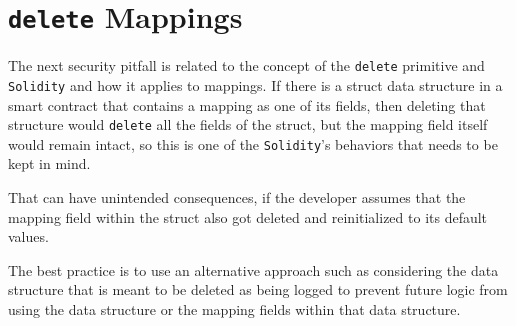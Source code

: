 \section{\texorpdfstring{\texttt{delete}
Mappings}{delete Mappings}}\label{delete-mappings}

The next security pitfall is related to the concept of the
\texttt{delete} primitive and \texttt{Solidity} and how it applies to
mappings. If there is a struct data structure in a smart contract that
contains a mapping as one of its fields, then deleting that structure
would \texttt{delete} all the fields of the struct, but the mapping
field itself would remain intact, so this is one of the
\texttt{Solidity}'s behaviors that needs to be kept in mind.

That can have unintended consequences, if the developer assumes that the
mapping field within the struct also got deleted and reinitialized to
its default values.

The best practice is to use an alternative approach such as considering
the data structure that is meant to be deleted as being logged to
prevent future logic from using the data structure or the mapping fields
within that data structure.
